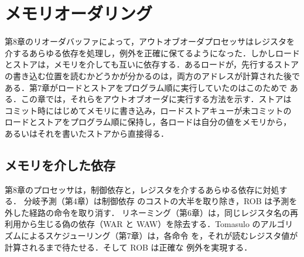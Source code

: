 \documentclass[../main.tex]{subfiles}
\begin{document}
\chapter{メモリオーダリング}

第8章のリオーダバッファによって，アウトオブオーダプロセッサはレジスタを
介するあらゆる依存を処理し，例外を正確に保てるようになった．しかしロード
とストアは，メモリを介しても互いに依存する．あるロードが，先行するストア
の書き込む位置を読むかどうかが分かるのは，両方のアドレスが計算された後で
ある．第7章がロードとストアをプログラム順に実行していたのはこのためで
ある．この章では，それらをアウトオブオーダに実行する方法を示す．ストアは
コミット時にはじめてメモリに書き込み，ロードストアキューが未コミットの
ロードとストアをプログラム順に保持し，各ロードは自分の値をメモリから，
あるいはそれを書いたストアから直接得る．

\section{メモリを介した依存}
\label{sec:l09-dependences}

第8章のプロセッサは，制御依存と，レジスタを介するあらゆる依存に対処する．
分岐予測（第4章）は制御依存
のコストの大半を取り除き，ROB は予測を外した経路の命令を取り消す．
リネーミング（第6章）は，同じレジスタ名の再利用から生じる偽の依存（WAR
と WAW）を除去する．Tomasulo のアルゴリズムによるスケジューリング（第7章）は，各命令
を，それが読むレジスタ値が計算されるまで待たせる．そして ROB は正確な
例外を実現する．
\end{document}
